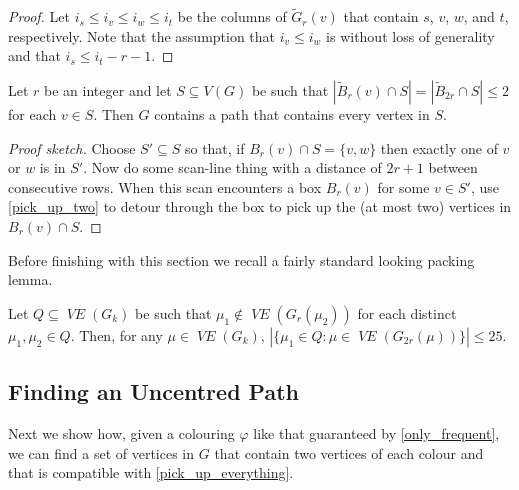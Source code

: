 \documentclass{patmorin}
\DeclareMathOperator{\VE}{\mathit{VE}}
\begin{document}
\begin{proof}
  Let $i_s \le i_v \le i_w \le i_t$ be the columns of $\tilde{G}_r(v)$ that contain $s$, $v$, $w$, and $t$, respectively.  Note that the assumption that $i_v \le i_w$ is without loss of generality and that $i_s \le i_t - r -1$.
\end{proof}

\begin{lem}\label{pick_up_everything}
  Let $r$ be an integer and let $S\subseteq V(G)$ be such that $|\tilde{B}_{r}(v)\cap S|=|\tilde{B}_{2r}\cap S|\le 2$ for each $v\in S$.  Then $G$ contains a path that contains every vertex in $S$. 
\end{lem}

\begin{proof}[Proof sketch]
  Choose $S'\subseteq S$ so that, if $B_r(v)\cap S=\{v,w\}$ then exactly one of $v$ or $w$ is in $S'$. Now do some scan-line thing with a distance of $2r+1$ between consecutive rows.  When this scan encounters a box $B_r(v)$ for some $v\in S'$, use \cref{pick_up_two} to detour through the box to pick up the (at most two) vertices in $B_r(v)\cap S$.
\end{proof}


Before finishing with this section we recall a fairly standard looking packing lemma.


\begin{lem}\label{packing_lemma}
  Let $Q\subseteq \VE(G_k)$ be such that $\mu_1\not\in \VE(G_r(\mu_2))$ for each distinct $\mu_1,\mu_2\in Q$.  Then, for any $\mu\in \VE(G_k)$,
  $|\{\mu_1\in Q: \mu\in \VE(G_{2r}(\mu))\}| \le 25$.
\end{lem}


\subsection{Finding an Uncentred Path}

Next we show how, given a colouring $\varphi$ like that guaranteed by \cref{only_frequent}, we can find a set of vertices in $G$ that contain two vertices of each colour and that is compatible with \cref{pick_up_everything}.
\end{document}
